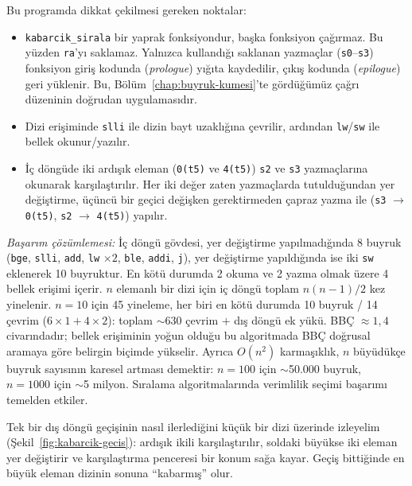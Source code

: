 \begin{ornek}[4.8]
Bu programda dikkat çekilmesi gereken noktalar:
\begin{itemize}
\item \texttt{kabarcik\_sirala} bir yaprak fonksiyondur, başka fonksiyon çağırmaz. Bu yüzden \texttt{ra}'yı saklamaz. Yalnızca kullandığı saklanan yazmaçlar (\texttt{s0}--\texttt{s3}) fonksiyon giriş kodunda (\emph{prologue}) yığıta kaydedilir, çıkış kodunda (\emph{epilogue}) geri yüklenir. Bu, Bölüm~\ref{chap:buyruk-kumesi}'te gördüğümüz çağrı düzeninin doğrudan uygulamasıdır.
\item Dizi erişiminde \texttt{slli} ile dizin bayt uzaklığına çevrilir, ardından \texttt{lw}/\texttt{sw} ile bellek okunur/yazılır.
\item İç döngüde iki ardışık eleman (\texttt{0(t5)} ve \texttt{4(t5)}) \texttt{s2} ve \texttt{s3} yazmaçlarına okunarak karşılaştırılır. Her iki değer zaten yazmaçlarda tutulduğundan yer değiştirme, üçüncü bir geçici değişken gerektirmeden çapraz yazma ile (\texttt{s3} $\rightarrow$ \texttt{0(t5)}, \texttt{s2} $\rightarrow$ \texttt{4(t5)}) yapılır.
\end{itemize}

\emph{Başarım çözümlemesi:} İç döngü gövdesi, yer değiştirme yapılmadığında 8 buyruk (\texttt{bge}, \texttt{slli}, \texttt{add}, \texttt{lw} $\times 2$, \texttt{ble}, \texttt{addi}, \texttt{j}), yer değiştirme yapıldığında ise iki \texttt{sw} eklenerek 10 buyruktur. En kötü durumda 2 okuma ve 2 yazma olmak üzere 4 bellek erişimi içerir. $n$ elemanlı bir dizi için iç döngü toplam $n(n-1)/2$ kez yinelenir. $n = 10$ için 45 yineleme, her biri en kötü durumda 10 buyruk / 14 çevrim ($6 \times 1 + 4 \times 2$): toplam $\sim$630 çevrim $+$ dış döngü ek yükü. BBÇ $\approx 1{,}4$ civarındadır; bellek erişiminin yoğun olduğu bu algoritmada BBÇ doğrusal aramaya göre belirgin biçimde yükselir. Ayrıca $O(n^2)$ karmaşıklık, $n$ büyüdükçe buyruk sayısının karesel artması demektir: $n = 100$ için $\sim$50.000 buyruk, $n = 1000$ için $\sim$5 milyon. Sıralama algoritmalarında verimlilik seçimi başarımı temelden etkiler.
\end{ornek}

Tek bir dış döngü geçişinin nasıl ilerlediğini küçük bir dizi üzerinde izleyelim (Şekil~\ref{fig:kabarcik-gecis}): ardışık ikili karşılaştırılır, soldaki büyükse iki eleman yer değiştirir ve karşılaştırma penceresi bir konum sağa kayar. Geçiş bittiğinde en büyük eleman dizinin sonuna ``kabarmış'' olur.


